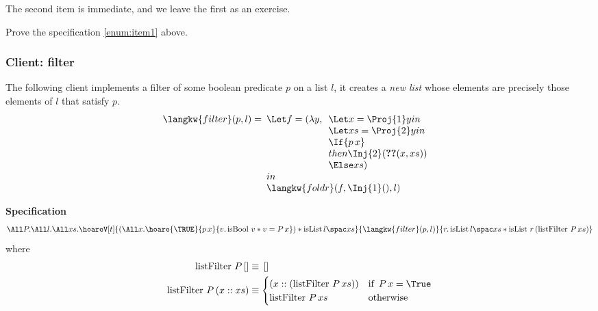 The second item is immediate, and we leave the first as an exercise.
\begin{exercise}
Prove the specification \eqref{enum:item1} above.
\end{exercise}



\subsubsection*{Client: filter}
The following client implements a filter of some boolean predicate $p$ on a list $l$, \ie{} it creates a \emph{new list} whose elements are precisely those elements of $l$ that satisfy $p$.
\begin{displaymath}
    {\langkw{filter} (p, l) =}
    \begin{array}[t]{l}
      \Let f = (\lambda y, \begin{array}[t]{l}
                             \Let x = \Proj{1}  y in\\
                             \Let xs = \Proj{2} y  in\\
                             \If {p\, x} \\
                             then \Inj{2} (\Ref (x, xs) ) \\
                             \Else  xs
                             )
                           \end{array}\\
      in \\
      \langkw{foldr}(f, \Inj{1}(), l)
    \end{array}
  \end{displaymath}
  
 \noindent \textbf{Specification}
\begin{align*}
\All P. \All l. \All xs. 
\hoareV[t]{ \left( \All x. \hoare{\TRUE}{p \, x}{v. \operatorname{isBool} \, v \ast v = P \, x}\right)
\ast \isList {l} {xs} }{\langkw{filter}(p, l)}{r.  \isList {l} {xs} \ast \operatorname{isList} \, r \left( \operatorname{listFilter} \, P \, xs \right)}
\end{align*}
where
\begin{align*}
\operatorname{listFilter} \, P \, [] &\equiv \, [] \\
\operatorname{listFilter} \, P \, (x :: xs) &\equiv \begin{cases} \left( x :: \left( \operatorname{listFilter} \, P \, xs \right) \right)
													  & \text{if } \, P \, x = \True  \\
\operatorname{listFilter} \, P \, xs  & \text{otherwise } \end{cases}
\end{align*}

